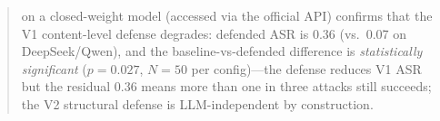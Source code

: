 \begin{abstract}
on a closed-weight model (accessed via the official API) confirms that the V1 content-level defense degrades: defended ASR is 0.36 (vs.\ 0.07 on DeepSeek/Qwen), and the baseline-vs-defended difference is \emph{statistically significant} ($p=0.027$, $N=50$ per config)---the defense reduces V1 ASR but the residual 0.36 means more than one in three attacks still succeeds; the V2 structural defense is LLM-independent by construction.
\end{abstract}
